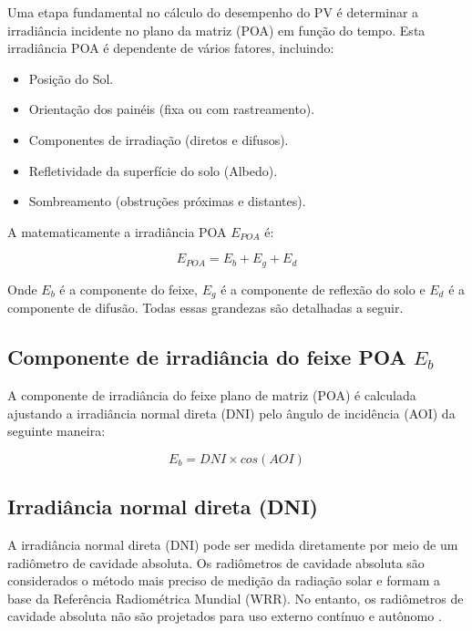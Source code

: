 Uma etapa fundamental no cálculo do desempenho do PV é determinar a irradiância incidente no plano da matriz (POA) em função do tempo. Esta irradiância POA é dependente de vários fatores, incluindo:

\begin{itemize}
  \item Posição do Sol.
  
  \item Orientação dos painéis (fixa ou com rastreamento).
  
  \item Componentes de irradiação (diretos e difusos).
  
  \item Refletividade da superfície do solo (Albedo).
  
  \item Sombreamento (obstruções próximas e distantes).
\end{itemize}

A matematicamente a irradiância POA $E_{POA}$ é:

\begin{equation}
    E_{POA} = E_b + E_g + E_d
    \label{eq:poa}
\end{equation}

Onde $E_b$ é a componente do feixe, $E_g$ é a componente de reflexão do solo e $E_d$ é a componente de difusão. Todas essas grandezas são detalhadas a seguir.

\newpage
\subsection{Componente de irradiância do feixe POA $E_b$}

A componente de irradiância do feixe plano de matriz (POA) é calculada ajustando a irradiância normal direta (DNI) pelo ângulo de incidência (AOI) da seguinte maneira:

\begin{equation}
    E_{b} = DNI \times cos(AOI)
    \label{eq:eb}
\end{equation}

\subsection{Irradiância normal direta (DNI)}

A irradiância normal direta (DNI) pode ser medida diretamente por meio de um radiômetro de cavidade absoluta. Os radiômetros de cavidade absoluta são considerados o método mais preciso de medição da radiação solar e formam a base da Referência Radiométrica Mundial (WRR). No entanto, os radiômetros de cavidade absoluta não são projetados para uso externo contínuo e autônomo \cite{sandia}.

